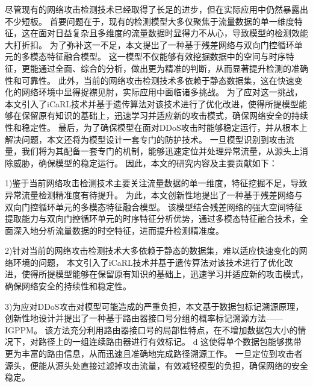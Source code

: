 尽管现有的网络攻击检测技术已经取得了长足的进步，但在实际应用中仍然暴露出不少短板。
首要问题在于，现有的检测模型大多仅聚焦于流量数据的单一维度特征，这在面对日益复杂且多维度的流量数据时显得力不从心，导致模型的检测效能大打折扣。
为了弥补这一不足，本文提出了一种基于残差网络与双向门控循环单元的多模态特征融合模型。
这一模型不仅能够有效挖掘数据中的空间与时序特征，更能通过全面、综合的分析，做出更为精准的判断，从而显著提升检测的准确性和可靠性。
此外，当前的网络攻击检测技术多依赖于静态数据集，这在快速变化的网络环境中显得捉襟见肘，实际应用中面临诸多挑战。
为了应对这一挑战，本文引入了iCaRL技术并基于遗传算法对该技术进行了优化改进，使得所提模型能够在保留原有知识的基础上，迅速学习并适应新的攻击模式，确保网络安全的持续性和稳定性。
最后，为了确保模型在面对DDoS攻击时能够稳定运行，并从根本上解决问题，本文还将为模型设计一套专门的防护技术。
一旦模型识别到攻击流量，我们将为其配备一套专门的机制，能够迅速定位并处理异常流量，从源头上消除威胁，确保模型的稳定运行。
因此，本文的研究内容及主要贡献如下：\par

1)鉴于当前网络攻击检测技术主要关注流量数据的单一维度，特征挖掘不足，导致异常流量检测精准度有待提升。
为此，本文创新性地提出了一种基于残差网络与双向门控循环单元的多模态特征融合模型。
该模型结合残差网络的强大空间特征提取能力与双向门控循环单元的时序特征分析优势，通过多模态特征融合技术，全面深入地分析流量数据的时空特征，进而提升检测精准度。\par

2)针对当前的网络攻击检测技术大多依赖于静态的数据集，难以适应快速变化的网络环境的问题，
本文引入了iCaRL技术并基于遗传算法对该技术进行了优化改进，使得所提模型能够在保留原有知识的基础上，迅速学习并适应新的攻击模式，确保网络安全的持续性和稳定性。\par

3)为应对DDoS攻击对模型可能造成的严重负担，本文基于数据包标记溯源原理，创新性地设计并提出了一种基于路由器接口号分组的概率标记溯源方法——IGPPM。
该方法充分利用路由器接口号的局部性特点，在不增加数据包大小的情况下，对路径上的一组连续路由器进行有效标记。    d              
这使得单个数据包能够携带更为丰富的路由信息，从而迅速且准确地完成路径溯源工作。
一旦定位到攻击者源头，便能从源头处直接过滤掉攻击流量，有效减轻模型的负担，确保网络的安全稳定。\par

